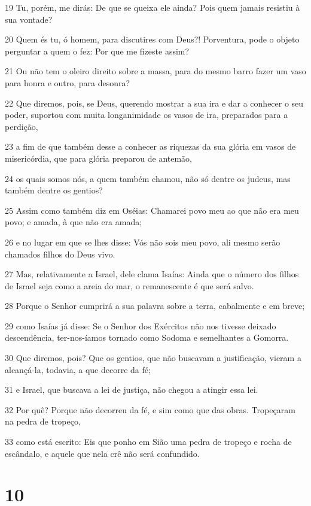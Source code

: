 \par 19 Tu, porém, me dirás: De que se queixa ele ainda? Pois quem jamais resistiu à sua vontade?
\par 20 Quem és tu, ó homem, para discutires com Deus?! Porventura, pode o objeto perguntar a quem o fez: Por que me fizeste assim?
\par 21 Ou não tem o oleiro direito sobre a massa, para do mesmo barro fazer um vaso para honra e outro, para desonra?
\par 22 Que diremos, pois, se Deus, querendo mostrar a sua ira e dar a conhecer o seu poder, suportou com muita longanimidade os vasos de ira, preparados para a perdição,
\par 23 a fim de que também desse a conhecer as riquezas da sua glória em vasos de misericórdia, que para glória preparou de antemão,
\par 24 os quais somos nós, a quem também chamou, não só dentre os judeus, mas também dentre os gentios?
\par 25 Assim como também diz em Oséias: Chamarei povo meu ao que não era meu povo; e amada, à que não era amada;
\par 26 e no lugar em que se lhes disse: Vós não sois meu povo, ali mesmo serão chamados filhos do Deus vivo.
\par 27 Mas, relativamente a Israel, dele clama Isaías: Ainda que o número dos filhos de Israel seja como a areia do mar, o remanescente é que será salvo.
\par 28 Porque o Senhor cumprirá a sua palavra sobre a terra, cabalmente e em breve;
\par 29 como Isaías já disse: Se o Senhor dos Exércitos não nos tivesse deixado descendência, ter-nos-íamos tornado como Sodoma e semelhantes a Gomorra.
\par 30 Que diremos, pois? Que os gentios, que não buscavam a justificação, vieram a alcançá-la, todavia, a que decorre da fé;
\par 31 e Israel, que buscava a lei de justiça, não chegou a atingir essa lei.
\par 32 Por quê? Porque não decorreu da fé, e sim como que das obras. Tropeçaram na pedra de tropeço,
\par 33 como está escrito: Eis que ponho em Sião uma pedra de tropeço e rocha de escândalo, e aquele que nela crê não será confundido.

\chapter{10}

